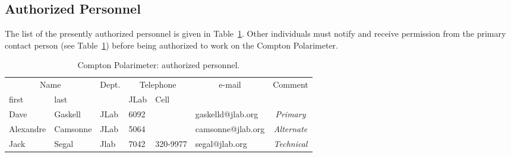 \begin{safetyen}{0}{0}


\end{safetyen}

\subsection{Authorized Personnel}
The list
of the presently authorized personnel is given in Table~\ref{tab:compton:personnel}.
Other individuals must notify and receive permission from
the primary contact person (see Table~\ref{tab:compton:personnel}) before being authorized to work on the Compton Polarimeter.

\begin{table}[ht]
\begin{center}
\begin{tabular}{|ll|l|l|l|l|c|} \hline
  \multicolumn{2}{|c|}{Name} & Dept. & \multicolumn{2}{c|}{Telephone} &
  \multicolumn{1}{c|}{e-mail} & Comment \\
  \cline{4-5}
    first & last & & JLab &  Cell&  & \\
\hline
 {Dave } & {Gaskell} & JLab   & 6092  &   & gaskelld@jlab.org     & \it Primary     \\
   Alexandre & Camsonne           & JLab   & 5064 &  & camsonne@jlab.org     & \it Alternate \\
   Jack   &  Segal           & Jlab   & 7042  &  320-9977& segal@jlab.org     & \it Technical \\
 \hline
\end{tabular}  
\end{center}
\caption[compton Polarimeter: authorized personnel]{
   Compton Polarimeter: authorized personnel. }
\label{tab:compton:personnel}
\end{table}

